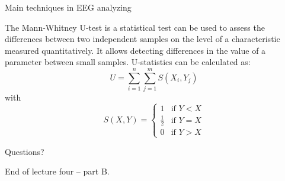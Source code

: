 \documentclass{beamer}
\begin{document}
\begin{frame}
{\centerline{Main techniques in EEG analyzing}}

The Mann-Whitney U-test is a statistical test can be used to assess the differences between two independent samples on the level of a characteristic measured quantitatively. It allows detecting differences in the value of a parameter between small samples. U-statistics can be calculated as:
\begin{equation}
    U=\sum_{i=1}^{n}\sum_{j=1}^{m} S(X_{i}, Y_{j})
\end{equation}
with 
\begin{equation}
    S(X,Y)=
    \begin{cases}
        1 & \text{if $Y<X$} \\
        \frac{1}{2} & \text{if $Y=X$} \\
        0 & \text{if $Y>X$}
    \end{cases}
\end{equation}
    
\end{frame}




\begin{frame}
{\centerline{Questions?}}
\begin{center}
    \vspace{2cm}
    \LARGE End of lecture four -- part B.
\end{center}

\end{frame}
\end{document}

